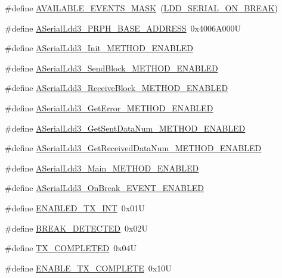 \begin{DoxyCompactItemize}
\item 
\#define \hyperlink{group___a_serial_ldd3__module_ga5f04a8830cd52a3ffa1678d113f31aee}{A\+V\+A\+I\+L\+A\+B\+L\+E\+\_\+\+E\+V\+E\+N\+T\+S\+\_\+\+M\+A\+SK}~(\hyperlink{group___p_e___types__module_ga5791992a91907e5233a850cd45ea8c21}{L\+D\+D\+\_\+\+S\+E\+R\+I\+A\+L\+\_\+\+O\+N\+\_\+\+B\+R\+E\+AK})
\item 
\#define \hyperlink{group___a_serial_ldd3__module_ga22374f43379b97c6a7d83757b8c8f25f}{A\+Serial\+Ldd3\+\_\+\+P\+R\+P\+H\+\_\+\+B\+A\+S\+E\+\_\+\+A\+D\+D\+R\+E\+SS}~0x4006\+A000U
\item 
\#define \hyperlink{group___a_serial_ldd3__module_ga3aa8317db38a33cad1c0e7275f460ee0}{A\+Serial\+Ldd3\+\_\+\+Init\+\_\+\+M\+E\+T\+H\+O\+D\+\_\+\+E\+N\+A\+B\+L\+ED}
\item 
\#define \hyperlink{group___a_serial_ldd3__module_ga3e19837b279c3ca5ea2a9a98b423932f}{A\+Serial\+Ldd3\+\_\+\+Send\+Block\+\_\+\+M\+E\+T\+H\+O\+D\+\_\+\+E\+N\+A\+B\+L\+ED}
\item 
\#define \hyperlink{group___a_serial_ldd3__module_gac276abf5bc63fe75e11a219ae63bb292}{A\+Serial\+Ldd3\+\_\+\+Receive\+Block\+\_\+\+M\+E\+T\+H\+O\+D\+\_\+\+E\+N\+A\+B\+L\+ED}
\item 
\#define \hyperlink{group___a_serial_ldd3__module_gafb6cf9f361b39c802d77ff54ea4019a8}{A\+Serial\+Ldd3\+\_\+\+Get\+Error\+\_\+\+M\+E\+T\+H\+O\+D\+\_\+\+E\+N\+A\+B\+L\+ED}
\item 
\#define \hyperlink{group___a_serial_ldd3__module_ga957baaf20d2d6e9ec6368fc5128af665}{A\+Serial\+Ldd3\+\_\+\+Get\+Sent\+Data\+Num\+\_\+\+M\+E\+T\+H\+O\+D\+\_\+\+E\+N\+A\+B\+L\+ED}
\item 
\#define \hyperlink{group___a_serial_ldd3__module_ga4e4293c3d175cc00d20fe04d18523657}{A\+Serial\+Ldd3\+\_\+\+Get\+Received\+Data\+Num\+\_\+\+M\+E\+T\+H\+O\+D\+\_\+\+E\+N\+A\+B\+L\+ED}
\item 
\#define \hyperlink{group___a_serial_ldd3__module_ga1538bbc5595927a3673e9c0c12f6540d}{A\+Serial\+Ldd3\+\_\+\+Main\+\_\+\+M\+E\+T\+H\+O\+D\+\_\+\+E\+N\+A\+B\+L\+ED}
\item 
\#define \hyperlink{group___a_serial_ldd3__module_gaa4ad1da3ff89abe4fe7c6b59a971ceb8}{A\+Serial\+Ldd3\+\_\+\+On\+Break\+\_\+\+E\+V\+E\+N\+T\+\_\+\+E\+N\+A\+B\+L\+ED}
\item 
\#define \hyperlink{group___a_serial_ldd3__module_gab05896dbf11eed7f4078978e7287669d}{E\+N\+A\+B\+L\+E\+D\+\_\+\+T\+X\+\_\+\+I\+NT}~0x01U
\item 
\#define \hyperlink{group___a_serial_ldd3__module_ga617e6f524bf659f58012c8f0248004e5}{B\+R\+E\+A\+K\+\_\+\+D\+E\+T\+E\+C\+T\+ED}~0x02U
\item 
\#define \hyperlink{group___a_serial_ldd3__module_ga1f79d891cf81d9f65cccd3a0ab84b1ee}{T\+X\+\_\+\+C\+O\+M\+P\+L\+E\+T\+ED}~0x04U
\item 
\#define \hyperlink{group___a_serial_ldd3__module_gac0fc7ebba74ca47c17389980225ddf48}{E\+N\+A\+B\+L\+E\+\_\+\+T\+X\+\_\+\+C\+O\+M\+P\+L\+E\+TE}~0x10U
\end{DoxyCompactItemize}

